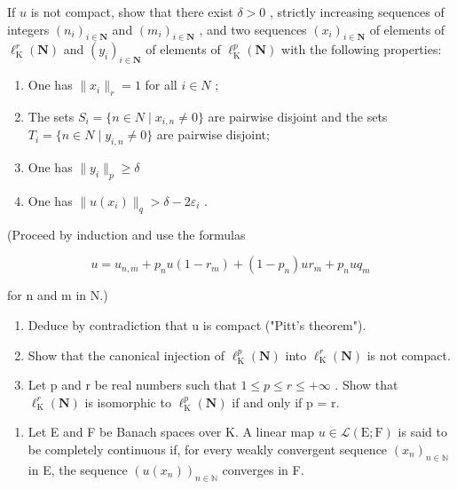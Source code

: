 If \(u\) is not compact, show that there exist \(\delta > 0\) , strictly increasing sequences of integers \((n_i)_{i \in \mathbf{N}}\) and \((m_i)_{i \in \mathbf{N}}\) , and two sequences \((x_i)_{i \in \mathbf{N}}\) of elements of \(\ell_{\mathrm{K}}^r(\mathbf{N})\) and \((y_i)_{i \in \mathbf{N}}\) of elements of \(\ell_{\mathrm{K}}^p(\mathbf{N})\) with the following properties:

\begin{enumerate}
\def\labelenumi{(\roman{enumi})}
\item
  One has \(\|x_{i}\|_{r}=1\) for all \(i\in N\) ;
\item
  The sets \(S_{i} = \{n \in N \mid x_{i,n} \neq 0\}\) are pairwise disjoint and the sets \(T_{i} = \{n \in N \mid y_{i,n} \neq 0\}\) are pairwise disjoint;
\item
  One has \(\| y_i\| _p\geqslant \delta\)
\item
  One has \(\|u(x_{i})\|_{q} > \delta - 2\varepsilon_{i}\) .
\end{enumerate}

(Proceed by induction and use the formulas

\[
u = u _ {n, m} + p _ {n} u (1 - r _ {m}) + (1 - p _ {n}) u r _ {m} + p _ {n} u q _ {m}
\]

for n and m in N.)

\begin{enumerate}
\def\labelenumi{\alph{enumi})}
\setcounter{enumi}{2}
\item
  Deduce by contradiction that u is compact ("Pitt's theorem").
\item
  Show that the canonical injection of \(\ell_{\mathrm{K}}^{p}(\mathbf{N})\) into \(\ell_{\mathrm{K}}^{r}(\mathbf{N})\) is not compact.
\item
  Let p and r be real numbers such that \(1 \leqslant p \leqslant r \leqslant +\infty\) . Show that \(\ell_{\mathrm{K}}^{r}(\mathbf{N})\) is isomorphic to \(\ell_{\mathrm{K}}^{p}(\mathbf{N})\) if and only if p = r.
\end{enumerate}

\begin{enumerate}
\def\labelenumi{\arabic{enumi})}
\setcounter{enumi}{10}
\tightlist
\item
  Let E and F be Banach spaces over K. A linear map \(u \in \mathcal{L}(\mathrm{E};\mathrm{F})\) is said to be completely continuous if, for every weakly convergent sequence \((x_{n})_{n \in \mathbb{N}}\) in E, the sequence \((u(x_{n}))_{n \in \mathbb{N}}\) converges in F.
\end{enumerate}

